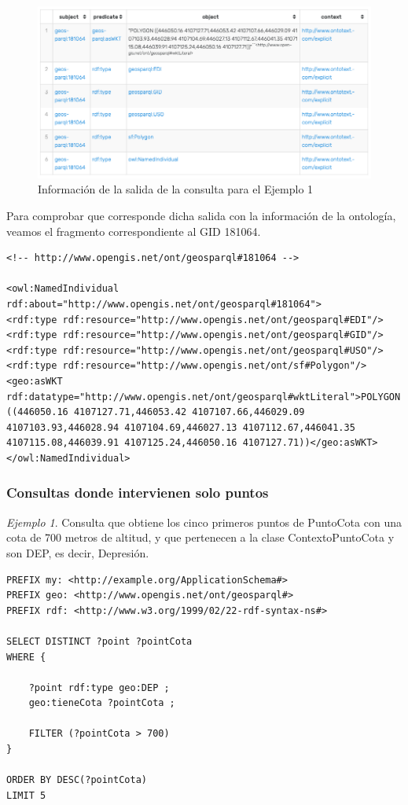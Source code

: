 \begin{figure}[H]
	\centering
	\includegraphics[width=0.9\linewidth]{imagenes/capitulo5/info-salida}
	\caption{Información de la salida de la consulta para el Ejemplo 1}
	\label{fig:info-salida}
\end{figure}

Para comprobar que corresponde dicha salida con la información de la ontología, veamos el fragmento correspondiente al GID 181064.

\begin{lstlisting}
<!-- http://www.opengis.net/ont/geosparql#181064 -->

<owl:NamedIndividual rdf:about="http://www.opengis.net/ont/geosparql#181064">
<rdf:type rdf:resource="http://www.opengis.net/ont/geosparql#EDI"/>
<rdf:type rdf:resource="http://www.opengis.net/ont/geosparql#GID"/>
<rdf:type rdf:resource="http://www.opengis.net/ont/geosparql#USO"/>
<rdf:type rdf:resource="http://www.opengis.net/ont/sf#Polygon"/>
<geo:asWKT rdf:datatype="http://www.opengis.net/ont/geosparql#wktLiteral">POLYGON ((446050.16 4107127.71,446053.42 4107107.66,446029.09 4107103.93,446028.94 4107104.69,446027.13 4107112.67,446041.35 4107115.08,446039.91 4107125.24,446050.16 4107127.71))</geo:asWKT>
</owl:NamedIndividual>
\end{lstlisting} 

\subsubsection{Consultas donde intervienen solo puntos}

\textit{Ejemplo 1}. Consulta que obtiene los cinco primeros puntos de PuntoCota con una cota de 700 metros de altitud, y que pertenecen a la clase ContextoPuntoCota y son DEP, es decir, Depresión. \\


\begin{lstlisting}
PREFIX my: <http://example.org/ApplicationSchema#>
PREFIX geo: <http://www.opengis.net/ont/geosparql#>
PREFIX rdf: <http://www.w3.org/1999/02/22-rdf-syntax-ns#>

SELECT DISTINCT ?point ?pointCota
WHERE {

	?point rdf:type geo:DEP ;
	geo:tieneCota ?pointCota ;
	
	FILTER (?pointCota > 700)
}

ORDER BY DESC(?pointCota)
LIMIT 5
\end{lstlisting}

